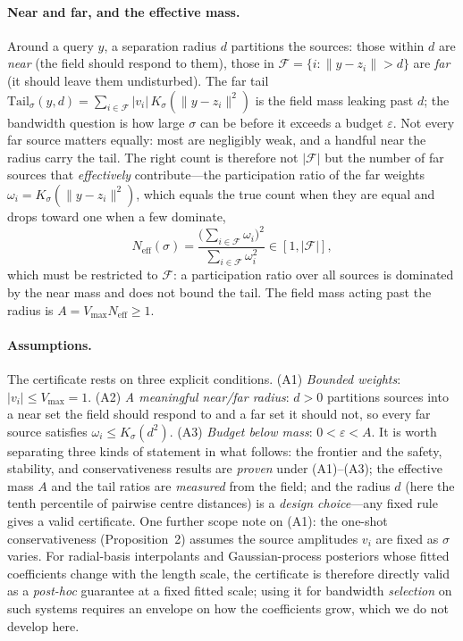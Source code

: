 \documentclass[10pt,twocolumn]{article}
\newcommand{\Ksig}{K_{\sigma}}
\newcommand{\Neff}{N_{\mathrm{eff}}}
\begin{document}
\paragraph{Near and far, and the effective mass.} Around a query $y$, a separation radius $d$ partitions the sources: those within $d$ are \emph{near} (the field should respond to them), those in $\mathcal{F}=\{i:\lVert y-z_i\rVert>d\}$ are \emph{far} (it should leave them undisturbed). The far tail $\mathrm{Tail}_\sigma(y,d)=\sum_{i\in\mathcal{F}}|v_i|\,\Ksig(\lVert y-z_i\rVert^2)$ is the field mass leaking past $d$; the bandwidth question is how large $\sigma$ can be before it exceeds a budget $\varepsilon$. Not every far source matters equally: most are negligibly weak, and a handful near the radius carry the tail. The right count is therefore not $|\mathcal{F}|$ but the number of far sources that \emph{effectively} contribute---the participation ratio of the far weights $\omega_i=\Ksig(\lVert y-z_i\rVert^2)$, which equals the true count when they are equal and drops toward one when a few dominate,
\begin{equation}
\Neff(\sigma)=\frac{\big(\sum_{i\in\mathcal{F}}\omega_i\big)^2}{\sum_{i\in\mathcal{F}}\omega_i^2}\in[1,|\mathcal{F}|],
\end{equation}
which must be restricted to $\mathcal{F}$: a participation ratio over all sources is dominated by the near mass and does not bound the tail. The field mass acting past the radius is $A=V_{\max}\Neff\ge1$.

\paragraph{Assumptions.} The certificate rests on three explicit conditions. (A1) \emph{Bounded weights}: $|v_i|\le V_{\max}=1$. (A2) \emph{A meaningful near/far radius}: $d>0$ partitions sources into a near set the field should respond to and a far set it should not, so every far source satisfies $\omega_i\le\Ksig(d^2)$. (A3) \emph{Budget below mass}: $0<\varepsilon<A$. It is worth separating three kinds of statement in what follows: the frontier and the safety, stability, and conservativeness results are \emph{proven} under (A1)--(A3); the effective mass $A$ and the tail ratios are \emph{measured} from the field; and the radius $d$ (here the tenth percentile of pairwise centre distances) is a \emph{design choice}---any fixed rule gives a valid certificate. One further scope note on (A1): the one-shot conservativeness (Proposition~2) assumes the source amplitudes $v_i$ are fixed as $\sigma$ varies. For radial-basis interpolants and Gaussian-process posteriors whose fitted coefficients change with the length scale, the certificate is therefore directly valid as a \emph{post-hoc} guarantee at a fixed fitted scale; using it for bandwidth \emph{selection} on such systems requires an envelope on how the coefficients grow, which we do not develop here.
\end{document}
